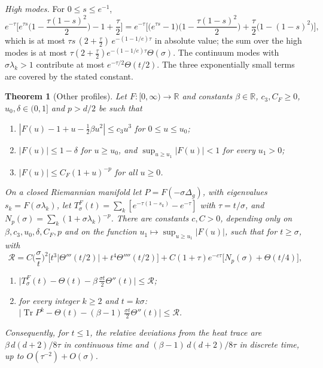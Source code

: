 \documentclass[11pt,a4paper]{article}
\makeatletter
\theoremstyle{stmt}
\newtheorem{theorem}{Theorem}[section]
\theoremstyle{defn}
\theoremstyle{rmk}
\renewenvironment{proof}[1][\proofname]{\par\pushQED{\qed}\normalfont\topsep6\p@\@plus6\p@\relax
  \trivlist\item[\hskip\labelsep{\sffamily\itshape\small #1.}]\ignorespaces}{\popQED\endtrivlist\@endpefalse}
\numberwithin{equation}{section}
\DeclareMathOperator{\Tr}{Tr}
\newcommand{\R}{\mathbb{R}}
\makeatother
\begin{document}
{\begin{proof}
\emph{High modes.} For $0\le s\le e^{-1}$,
\[
e^{-\tau}\Big[e^{\tau s}\Big(1-\frac{\tau(1-s)^2}{2}\Big)-1+\frac\tau2\Big]=e^{-\tau}\Big[\big(e^{\tau s}-1\big)\Big(1-\frac{\tau(1-s)^2}{2}\Big)+\frac\tau2\big(1-(1-s)^2\big)\Big],
\]
which is at most $\tau s\,(2+\tfrac\tau2)\,e^{-(1-1/e)\tau}$ in absolute value; the sum over the high modes is at most $\tau(2+\tfrac\tau2)e^{-(1-1/e)\tau}\Theta(\sigma)$. The continuum modes with $\sigma\lambda_k>1$ contribute at most $e^{-\tau/2}\Theta(t/2)$. The three exponentially small terms are covered by the stated constant.
\end{proof}

\begin{theorem}[Other profiles]\label{thm:profile}
Let $F:[0,\infty)\to\R$ and constants $\beta\in\R$, $c_3,C_F\ge0$, $u_0,\delta\in(0,1]$ and $p>d/2$ be such that
\begin{enumerate}[label=\textup{(F\arabic*)}]
\item $|F(u)-1+u-\tfrac12\beta u^2|\le c_3u^3$ for $0\le u\le u_0$;
\item $|F(u)|\le1-\delta$ for $u\ge u_0$, and $\sup_{u\ge u_1}|F(u)|<1$ for every $u_1>0$;
\item $|F(u)|\le C_F(1+u)^{-p}$ for all $u\ge0$.
\end{enumerate}
On a closed Riemannian manifold let $P=F(-\sigma\Delta_g)$, with eigenvalues $s_k=F(\sigma\lambda_k)$, let $T^F_\sigma(t)=\sum_k[e^{-\tau(1-s_k)}-e^{-\tau}]$ with $\tau=t/\sigma$, and $N_p(\sigma)=\sum_k(1+\sigma\lambda_k)^{-p}$. There are constants $c,C>0$, depending only on $\beta,c_3,u_0,\delta,C_F,p$ and on the function $u_1\mapsto\sup_{u\ge u_1}|F(u)|$, such that for $t\ge\sigma$, with
\[
\mathcal R=C\Big(\frac\sigma t\Big)^{2}\Big[t^3|\Theta'''(t/2)|+t^4\Theta''''(t/2)\Big]+C(1+\tau)e^{-c\tau}\big[N_p(\sigma)+\Theta(t/4)\big],
\]
\begin{enumerate}[label=\textup{(\roman*)}]
\item $\big|T^F_\sigma(t)-\Theta(t)-\beta\,\tfrac{\sigma t}{2}\Theta''(t)\big|\le\mathcal R$;
\item for every integer $k\ge2$ and $t=k\sigma$: $\big|\Tr P^k-\Theta(t)-(\beta-1)\,\tfrac{\sigma t}{2}\Theta''(t)\big|\le\mathcal R$.
\end{enumerate}
Consequently, for $t\le1$, the relative deviations from the heat trace are $\beta\,d(d+2)/8\tau$ in continuous time and $(\beta-1)\,d(d+2)/8\tau$ in discrete time, up to $O(\tau^{-2})+O(\sigma)$.
\end{theorem}

}
\end{document}
